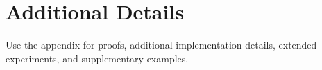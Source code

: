 \section{Additional Details}

Use the appendix for proofs, additional implementation details, extended
experiments, and supplementary examples.
